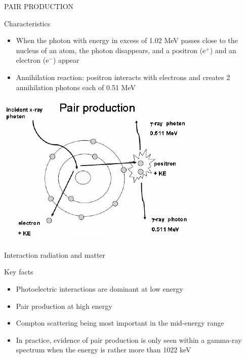 \begin{frame}{PAIR PRODUCTION}

\vskip0.3cm
\begin{exampleblock}{Characteristics}

\begin{itemize}
\item When the photon with energy in excess of 1.02 MeV passes close to the nucleus of an atom, the photon disappears, and a positron (e$^{+}$) and an electron (e$^{-}$) appear 
\item Annihilation reaction: positron interacts with electrons and creates 2 annihilation photons each of 0.51 MeV
\end{itemize}

\end{exampleblock}

\centering
\includegraphics[scale=0.5]{figures/pairproduction.png}

\end{frame}

\begin{frame}{Interaction radiation and matter}

\begin{exampleblock}{Key facts}

\begin{itemize}
\item Photoelectric interactions are dominant at low energy 
\item Pair production at high energy 
\item Compton scattering being most important in the mid-energy range 
\item In practice, evidence of pair production is only seen within a gamma-ray spectrum when the energy is rather more than 1022 keV
\end{itemize}

\end{exampleblock}

\end{frame}

